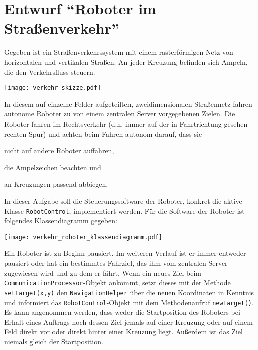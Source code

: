 
\section{Entwurf \enquote{Roboter im Straßenverkehr} }

Gegeben ist ein Straßenverkehrssystem mit einem rasterförmigen Netz von horizontalen und vertikalen Straßen.
An jeder Kreuzung befinden sich Ampeln, die den Verkehrsfluss steuern.

\begin{center}
	\texttt{[image: verkehr\_skizze.pdf]}
\end{center}

In diesem auf einzelne Felder aufgeteilten, zweidimensionalen Straßennetz fahren autonome Roboter zu von einem zentralen Server vorgegebenen Zielen.
Die Roboter fahren im Rechtsverkehr (d.h. immer auf der in Fahrtrichtung gesehen rechten Spur) und achten beim Fahren autonom darauf, dass sie 
\begin{enumerate*}
 	\item nicht auf andere Roboter auffahren,
 	\item die Ampelzeichen beachten und 
 	\item an Kreuzungen passend abbiegen.
 \end{enumerate*} 

In dieser Aufgabe soll die Steuerungssoftware der Roboter, konkret die aktive Klasse \texttt{RobotControl}, implementiert werden. Für die Software der Roboter ist folgendes Klassendiagramm gegeben:

\begin{center}
	\texttt{[image: verkehr\_roboter\_klassendiagramm.pdf]}
\end{center}


Ein Roboter ist zu Beginn pausiert.
Im weiteren Verlauf ist er immer entweder pausiert oder hat ein bestimmtes Fahrziel, das ihm vom zentralen Server zugewiesen wird und zu dem er fährt.
Wenn ein neues Ziel beim \texttt{CommunicationProcessor}-Objekt ankommt, setzt dieses mit der Methode \texttt{setTarget(x,y)} den \texttt{NavigationHelper} über die neuen Koordinaten in Kenntnis und informiert das \texttt{RobotControl}-Objekt mit dem Methodenaufruf \texttt{newTarget()}.
Es kann angenommen werden, dass weder die Startposition des Roboters bei Erhalt eines Auftrags noch dessen Ziel jemals auf einer Kreuzung oder auf einem Feld direkt vor oder direkt hinter einer Kreuzung liegt.
Außerdem ist das Ziel niemals gleich der Startposition. 

